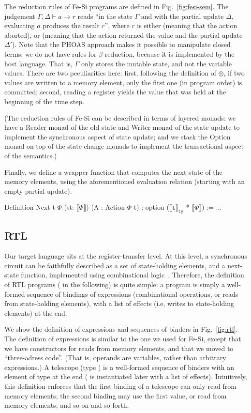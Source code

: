 \documentclass{llncs}
\newcommand{\denote}[1]{\llbracket #1 \rrbracket}
\newcommand{\denotety}[1]{\denote{\mathtt{#1}}_{\mathtt{ty}}}
\begin{document}
The reduction rules of Fe-Si programs are defined in
Fig.~\ref{fig:fesi-sem}. The judgement $\Gamma, \Delta \vdash a \to r$
reads ``in the state $\Gamma$ and with the partial update $\Delta$,
evaluating $a$ produces the result $r$'', where $r$ is either
 (meaning that the action aborted), or %
 (meaning that the action returned the value
 and the partial update $\Delta'$). 
%
Note that the PHOAS approach makes it possible to manipulate closed
terms: we do not have rules for $\beta$-reduction, because it is
implemented by the host language.
%
That is, $\Gamma$ only stores the mutable state, and not the variable
values.
%
There are two peculiarities here: first, following the definition of
$\oplus$, if two values are written to a memory element, only the
first one (in program order) is committed; second, reading a register
yields the value that was held at the beginning of the time step. 

(The reduction rules of Fe-Si can be described in terms of layered
monads: we have a Reader monad of the old state and Writer monad of
the state update to implement the synchronous aspect of state update;
and we stack the Option monad on top of the state-change monads to
implement the transactional aspect of the semantics.)

Finally, we define a wrapper function that computes the next state of
the memory elements, using the aforementioned evaluation relation
(starting with an empty partial update). 
\begin{mcoq}
Definition Next {t} {$\Phi$} (st: $\denote{\Phi}$) (A : Action $\Phi$ t) : option ($\denotety{t}$ * $\denote{\Phi}$) := ...
\end{mcoq}

\subsection{RTL} 
Our target language sits at the register-transfer level. At this
level, a synchronous circuit can be faithfully described as a set of
state-holding elements, and a next-state function, implemented using
combinational logic~\cite{DBLP:journals/cj/Gordon02}.
%
Therefore, the definition of RTL programs ( in the
following) is quite simple: a program is simply a well-formed sequence
of bindings of expressions (combinational operations, or reads from
state-holding elements), with a list of effects (i.e, writes to
state-holding elements) at the end.

We show the definition of expressions and sequences of binders in
Fig.~\ref{fig:rtl}.
%
The definition of expressions is similar to the one we used for Fe-Si,
except that we have constructors for reads from memory elements, and
that we moved to ``three-adress code''.
%
(That is, operands are variables, rather than arbitrary expressions.)
%
A telescope (type ) is a well-formed sequence of binders
with an element of type  at the end ( is instantiated
later with a list of effects). Intuitively, this definition enforces
that the first binding of a telescope can only read from memory
elements; the second binding may use the first value, or read from
memory elements; and so on and so forth.
\end{document}
